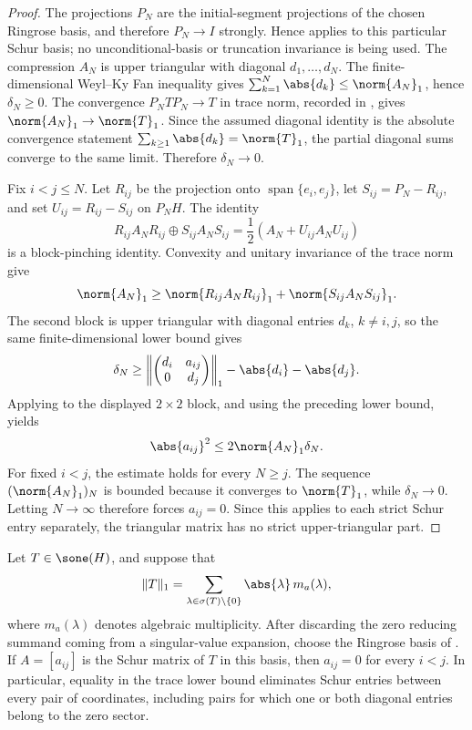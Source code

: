 \begin{proof}
  The projections \(P_N\) are the initial-segment projections of the chosen
  Ringrose basis, and therefore \(P_N\to I\) strongly.  Hence
   applies to this particular Schur
  basis; no unconditional-basis or truncation invariance is being used.
  The compression \(A_N\) is upper triangular with diagonal
  \(d_1,\ldots,d_N\). The finite-dimensional Weyl--Ky Fan inequality gives
  \(\sum_{k=1}^N\abs{d_k}\le\norm{A_N}_1\), hence \(\delta_N\ge0\).
  The convergence \(P_NTP_N\to T\) in trace norm, recorded in
  , gives
  \(\norm{A_N}_1\to\norm{T}_1\). Since the assumed diagonal identity is the
  absolute convergence statement
  \(\sum_{k\ge1}\abs{d_k}=\norm{T}_1\), the partial diagonal sums converge
  to the same limit. Therefore \(\delta_N\to0\).

  Fix \(i<j\le N\). Let \(R_{ij}\) be the projection onto
  \(\operatorname{span}\{e_i,e_j\}\), let \(S_{ij}=P_N-R_{ij}\), and set
  \(U_{ij}=R_{ij}-S_{ij}\) on \(P_NH\). The identity
  \[
    R_{ij}A_NR_{ij}\oplus S_{ij}A_NS_{ij}
    =\frac12(A_N+U_{ij}A_NU_{ij})
  \]
  is a block-pinching identity. Convexity and unitary invariance of the
  trace norm give
  \[
    \norm{A_N}_1
    \ge \norm{R_{ij}A_NR_{ij}}_1+\norm{S_{ij}A_NS_{ij}}_1.
  \]
  The second block is upper triangular with diagonal entries
  \(d_k\), \(k\ne i,j\), so the same finite-dimensional lower bound gives
  \[
    \delta_N\ge
    \left\|
      \begin{pmatrix}d_i&a_{ij}\\0&d_j\end{pmatrix}
    \right\|_1-\abs{d_i}-\abs{d_j}.
  \]
  Applying  to the displayed
  \(2\times2\) block, and using the preceding lower bound, yields
  \[
    \abs{a_{ij}}^2
    \le 2\norm{A_N}_1\delta_N .
  \]
  For fixed \(i<j\), the estimate holds for every \(N\ge j\).  The sequence
  \((\norm{A_N}_1)_N\) is bounded because it converges to \(\norm{T}_1\),
  while \(\delta_N\to0\).  Letting \(N\to\infty\) therefore forces
  \(a_{ij}=0\).  Since this applies to each strict Schur entry separately,
  the triangular matrix has no strict upper-triangular part.
\end{proof}

\begin{lemma}
  \label{lem:zero-sector-schur-elimination-equality-fiber}
  Let \(T\in\sone(H)\), and suppose that
  \[
    \|T\|_1=
    \sum_{\lambda\in\sigma(T)\setminus\{0\}}
      \abs{\lambda}\,m_a(\lambda),
  \]
  where \(m_a(\lambda)\) denotes algebraic multiplicity. After discarding the
  zero reducing summand coming from a singular-value expansion, choose the
  Ringrose basis of . If
  \(A=[a_{ij}]\) is the Schur matrix of \(T\) in this basis, then
  \(a_{ij}=0\) for every \(i<j\). In particular, equality in the trace lower
  bound eliminates Schur entries between every pair of coordinates, including
  pairs for which one or both diagonal entries belong to the zero sector.
\end{lemma}

